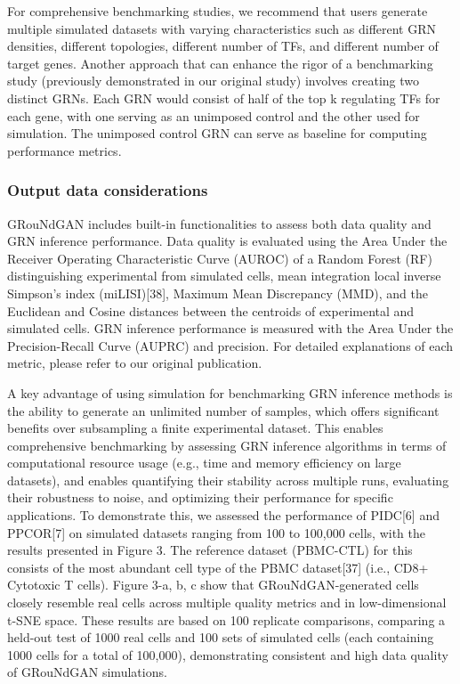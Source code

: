For comprehensive benchmarking studies, we recommend that users generate multiple
simulated datasets with varying characteristics such as different GRN densities, different
topologies, different number of TFs, and different number of target genes. Another approach
that can enhance the rigor of a benchmarking study (previously demonstrated in our original
study) involves creating two distinct GRNs. Each GRN would consist of half of the top k regulating
TFs for each gene, with one serving as an unimposed control and the other used for simulation.
The unimposed control GRN can serve as baseline for computing performance metrics.

\subsubsection*{Output data considerations}

GRouNdGAN includes built-in functionalities to assess both data quality and GRN inference
performance. Data quality is evaluated using the Area Under the Receiver Operating
Characteristic Curve (AUROC) of a Random Forest (RF) distinguishing experimental from
simulated cells, mean integration local inverse Simpson’s index (miLISI)[38], Maximum Mean
Discrepancy (MMD), and the Euclidean and Cosine distances between the centroids of
experimental and simulated cells. GRN inference performance is measured with the Area Under
the Precision-Recall Curve (AUPRC) and precision. For detailed explanations of each metric,
please refer to our original publication.

A key advantage of using simulation for benchmarking GRN inference methods is the ability to
generate an unlimited number of samples, which offers significant benefits over subsampling a
finite experimental dataset. This enables comprehensive benchmarking by assessing GRN
inference algorithms in terms of computational resource usage (e.g., time and memory efficiency
on large datasets), and enables quantifying their stability across multiple runs, evaluating their
robustness to noise, and optimizing their performance for specific applications. To demonstrate
this, we assessed the performance of PIDC[6] and PPCOR[7] on simulated datasets ranging from
100 to 100,000 cells, with the results presented in Figure 3. The reference dataset (PBMC-CTL)
for this consists of the most abundant cell type of the PBMC dataset[37] (i.e., CD8+ Cytotoxic T
cells). Figure 3-a, b, c show that GRouNdGAN-generated cells closely resemble real cells across
multiple quality metrics and in low-dimensional t-SNE space. These results are based on 100
replicate comparisons, comparing a held-out test of 1000 real cells and 100 sets of simulated cells (each containing 1000 cells for a total of 100,000), demonstrating consistent and high data quality
of GRouNdGAN simulations.

